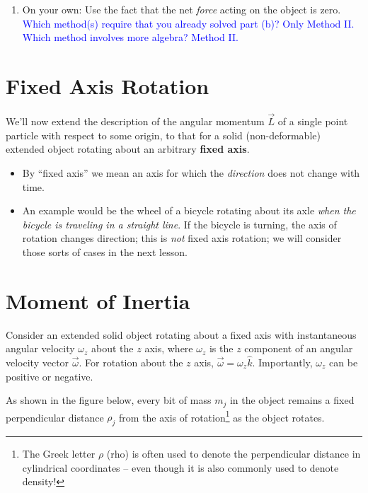 \documentclass[11pt, letterpaper, openany]{book}
\newenvironment{exercise}[1][Exercise]{%
  \tcolorbox[blanker, breakable, left=1em,
    before skip=1em, after skip=1em,
    borderline west={3pt}{0pt}{PhysNavy},
    colback=PhysCream,
    before upper={\textcolor{PhysNavy}{\sffamily\bfseries #1:}\space}
  ]%
}{%
  \endtcolorbox%
}
\begin{document}
\begin{exercise}[Exercise 2]
\begin{enumerate}[label=(\alph*)]
\begin{enumerate}[label=(\Roman*)]
        \item On your own: Use the fact that the net \textit{force} acting on the object is zero. \\
        \textcolor{blue}{Which method(s) require that you already solved part (b)? Only Method II. \\
        Which method involves more algebra? Method II.}
    \end{enumerate}
\end{enumerate}
\end{exercise}

\section*{Fixed Axis Rotation}

We'll now extend the description of the angular momentum $\vec{L}$ of a single point particle with respect to some origin, to that for a solid (non-deformable) extended object rotating about an arbitrary \textbf{fixed axis}.
\begin{itemize}
    \item By ``fixed axis'' we mean an axis for which the \textit{direction} does not change with time.
    \item An example would be the wheel of a bicycle rotating about its axle \textit{when the bicycle is traveling in a straight line}. If the bicycle is turning, the axis of rotation changes direction; this is \textit{not} fixed axis rotation; we will consider those sorts of cases in the next lesson.
\end{itemize}

\section*{Moment of Inertia}

Consider an extended solid object rotating about a fixed axis with instantaneous angular velocity $\omega_z$ about the $z$ axis, where $\omega_z$ is the $z$ component of an angular velocity vector $\vec{\omega}$. For rotation about the $z$ axis, $\vec{\omega} = \omega_z\hat{k}$. Importantly, $\omega_z$ can be positive or negative.

As shown in the figure below, every bit of mass $m_j$ in the object remains a fixed perpendicular distance $\rho_j$ from the axis of rotation\footnote{The Greek letter $\rho$ (rho) is often used to denote the perpendicular distance in cylindrical coordinates -- even though it is also commonly used to denote density!} as the object rotates.
\end{document}
